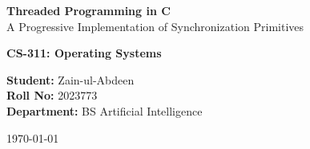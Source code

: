\documentclass[12pt,a4paper]{article}
\begin{document}
\begin{titlepage}
\pagecolor{osgray}
\color{osblue}

\centering
\vspace*{2cm}

{\Huge\bfseries Threaded Programming in C}\\[0.6cm]
{\Large A Progressive Implementation of Synchronization Primitives}\\[1.2cm]


\vspace{1.5cm}

{\Large\textbf{CS-311: Operating Systems}}\\[1cm]

\vfill

\begin{tcolorbox}[width=0.8\textwidth,colback=white,colframe=osaccent]
\centering
\textbf{Student:} Zain-ul-Abdeen\\
\textbf{Roll No:} 2023773\\
\textbf{Department:} BS Artificial Intelligence
\end{tcolorbox}

\vfill

{\large \today}

\end{titlepage}
\nopagecolor

\end{document}
